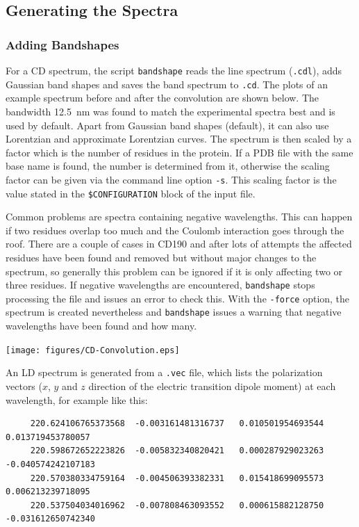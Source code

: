 \documentclass[11pt, letterpaper]{article}
\begin{document}


\subsection{Generating the Spectra}

\subsubsection{Adding Bandshapes}

For a CD spectrum, the script \verb'bandshape' reads the line spectrum (\verb'.cdl'), adds Gaussian band shapes and saves the band spectrum to \verb'.cd'. The plots of an example spectrum before and after the convolution are shown below. The bandwidth 12.5~nm was found to match the experimental spectra best and is used by default.\cite{Hirst:03:11813, Bulheller:07:2020} Apart from Gaussian band shapes (default), it can also use Lorentzian and approximate Lorentzian curves. The spectrum is then scaled by a factor which is the number of residues in the protein. If a PDB file with the same base name is found, the number is determined from it, otherwise the scaling factor can be given via the command line option \verb'-s'. This scaling factor is the value stated in the \verb'$CONFIGURATION' block of the input file.

Common problems are spectra containing negative wavelengths. This can happen if two residues overlap too much and the Coulomb interaction goes through the roof. There are a couple of cases in CD190\cite{Bulheller:07:2020} and after lots of attempts the affected residues have been found and removed but without major changes to the spectrum, so generally this problem can be ignored if it is only affecting two or three residues. If negative wavelengths are encountered, \verb'bandshape' stops processing the file and issues an error to check this. With the \verb'-force' option, the spectrum is created nevertheless and \verb'bandshape' issues a warning that negative wavelengths have been found and how many.

\texttt{[image: figures/CD-Convolution.eps]}

An LD spectrum is generated from a \verb'.vec' file, which lists the polarization vectors ($x$, $y$ and $z$ direction of the electric transition dipole moment) at each wavelength, for example like this:

{\small
\begin{verbatim}
     220.624106765373568  -0.003161481316737   0.010501954693544   0.013719453780057
     220.598672652223826  -0.005832340820421   0.000287929023263  -0.040574242107183
     220.570380334759164  -0.004506393382331   0.015418699095573   0.006213239718095
     220.537504034016962  -0.007808463093552   0.000615882128750  -0.031612650742340
\end{verbatim}
}
\end{document}
